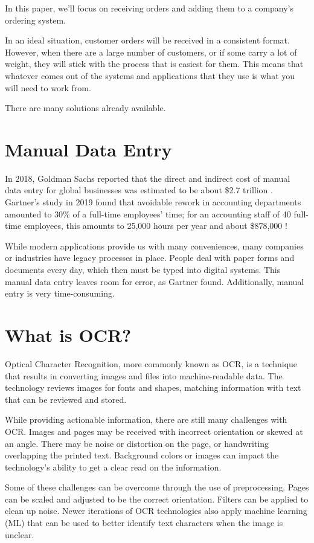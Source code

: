 \documentclass[conference]{IEEEtran}
\begin{document}
In this paper, we'll focus on receiving orders and adding them to a company's ordering system.

In an ideal situation, customer orders will be received in a consistent format. However, when there are a large number of customers, or if some carry a lot of weight, they will stick with the process that is easiest for them. This means that whatever comes out of the systems and applications that they use is what you will need to work from.

There are many solutions already available.

\section{Manual Data Entry}
In 2018, Goldman Sachs reported that the direct and indirect cost of manual data entry for global businesses was estimated to be about \$2.7 trillion \cite{schneider2018b2b}. Gartner's study in 2019 found that avoidable rework in accounting departments amounted to 30\% of a full-time employees' time; for an accounting staff of 40 full-time employees, this amounts to 25,000 hours per year and about \$878,000 \cite{lavelle2019gartner}!

While modern applications provide us with many conveniences, many companies or industries have legacy processes in place. People deal with paper forms and documents every day, which then must be typed into digital systems. This manual data entry leaves room for error, as Gartner found. Additionally, manual entry is very time-consuming.

\section{What is OCR?}
Optical Character Recognition, more commonly known as OCR, is a technique that results in converting images and files into machine-readable data. The technology reviews images for fonts and shapes, matching information with text that can be reviewed and stored.

While providing actionable information, there are still many challenges with OCR. Images and pages may be received with incorrect orientation or skewed at an angle. There may be noise or distortion on the page, or handwriting overlapping the printed text. Background colors or images can impact the technology's ability to get a clear read on the information.

Some of these challenges can be overcome through the use of preprocessing. Pages can be scaled and adjusted to be the correct orientation. Filters can be applied to clean up noise. Newer iterations of OCR technologies also apply machine learning (ML) that can be used to better identify text characters when the image is unclear.
\end{document}

